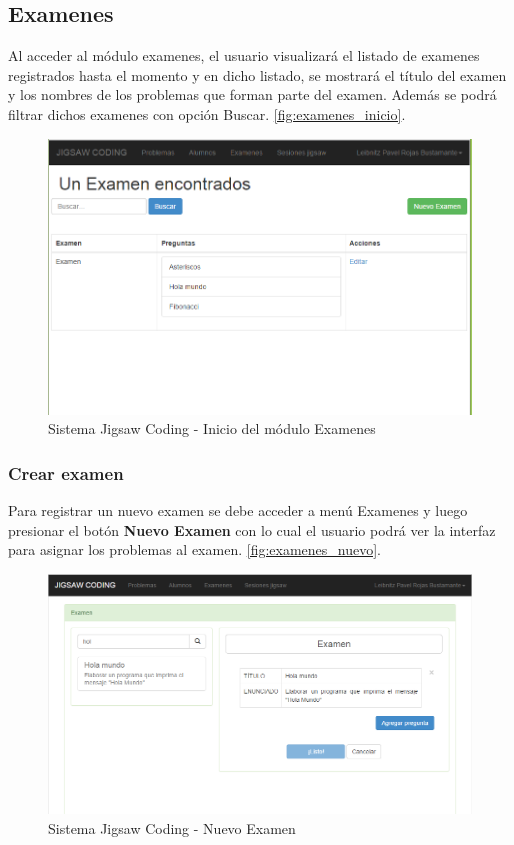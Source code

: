 \subsection{Examenes}
Al acceder al módulo examenes, el usuario visualizará el listado de examenes registrados hasta el momento y en dicho listado, se mostrará el título del examen y los nombres de los problemas que forman parte del examen. Además se podrá filtrar dichos examenes con opción Buscar. \autoref{fig:examenes_inicio}.

\begin{figure}[h!]
	\centering
	\caption[SJC Examenes]{Sistema Jigsaw Coding - Inicio del módulo Examenes}
	\label{fig:examenes_inicio}
	\includegraphics[scale=0.5]{figuras/usodelsistema/docente/examenes_inicio}
\end{figure}
\subsubsection{Crear examen}

Para registrar un nuevo examen se debe acceder a menú Examenes y luego presionar el botón \textbf{Nuevo Examen} con lo cual el usuario podrá ver la interfaz para asignar los problemas al examen. \autoref{fig:examenes_nuevo}. \\

\begin{figure}[h!]
	\centering
	\caption[SJC Nuevo examen]{Sistema Jigsaw Coding - Nuevo Examen}
	\label{fig:examenes_nuevo}
	\includegraphics[scale=0.5]{figuras/usodelsistema/docente/examenes_nuevo}
\end{figure}

